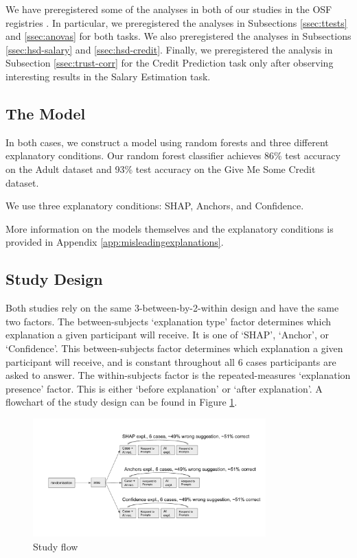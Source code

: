 We have preregistered some of the analyses in both of our studies in the OSF registries \cite{natarajan_binns_2022}. In particular, we preregistered the analyses in Subsections \ref{ssec:ttests} and \ref{ssec:anovas} for both tasks. We also preregistered the analyses in Subsections \ref{ssec:hsd-salary} and \ref{ssec:hsd-credit}. Finally, we preregistered the analysis in Subsection \ref{ssec:trust-corr} for the Credit Prediction task only after observing interesting results in the Salary Estimation task.

\subsection{The Model}
In both cases, we construct a model using random forests and three different explanatory conditions. Our random forest classifier achieves 86\% test accuracy on the Adult dataset and 93\% test accuracy on the Give Me Some Credit dataset.

We use three explanatory conditions: SHAP, Anchors, and Confidence. 

More information on the models themselves and the explanatory conditions is provided in Appendix \ref{app:misleadingexplanations}. 

\subsection{Study Design}
Both studies rely on the same 3-between-by-2-within design and have the same two factors. The between-subjects `explanation type' factor determines which explanation a given participant will receive. It is one of `SHAP', `Anchor', or `Confidence'. This between-subjects factor determines which explanation a given participant will receive, and is constant throughout all 6 cases participants are asked to answer. The within-subjects factor is the repeated-measures `explanation presence' factor. This is either `before explanation' or `after explanation'. A flowchart of the study design can be found in Figure \ref{fig:flowchart}.

\begin{figure}[htbp]
    \centering
    \includegraphics[width=0.8\textwidth]{figures/misleading_explanations/flowchart.png}
    \caption{Study flow}
    \label{fig:flowchart}
\end{figure}

